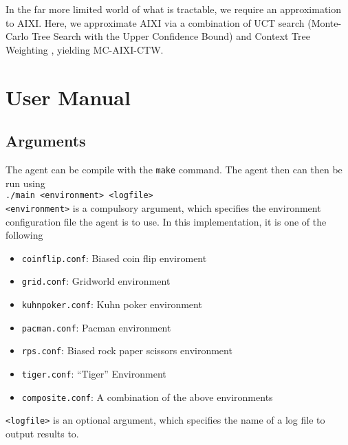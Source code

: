 \documentclass[pdftex,twoside,a4paper]{report}
\begin{document}
In the far more limited world of what is tractable, we require an
approximation to AIXI. Here, we approximate AIXI via a combination of UCT
search (Monte-Carlo Tree Search with the Upper Confidence Bound)
\citep{kocsis2006bandit} and Context Tree Weighting
\citep{willems1995context}, yielding MC-AIXI-CTW.

\chapter{User Manual}
\section{Arguments}
The agent can be compile with the \texttt{make} command. The agent then can then be run using\\

\texttt{./main <environment> <logfile>}\\

\texttt{<environment>} is a compulsory argument, which specifies the environment configuration file the agent is to use. In this implementation, it is one of the following
\begin{itemize}
\item \texttt{coinflip.conf}: Biased coin flip enviroment
\item \texttt{grid.conf}: Gridworld environment
\item \texttt{kuhnpoker.conf}: Kuhn poker environment
\item \texttt{pacman.conf}: Pacman environment
\item \texttt{rps.conf}: Biased rock paper scissors environment
\item \texttt{tiger.conf}: ``Tiger'' Environment
\item \texttt{composite.conf}: A combination of the above environments
\end{itemize}
\texttt{<logfile>} is an optional argument, which specifies the name of a log file to output results to.
\newline
\end{document}
